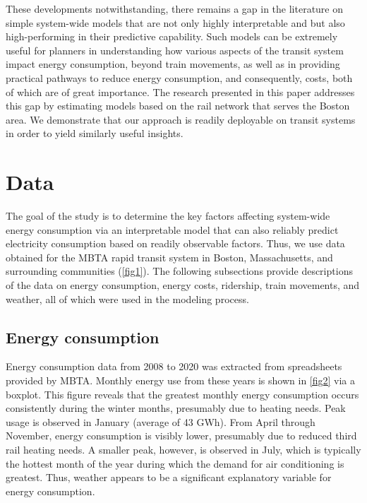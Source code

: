 \documentclass[times]{TRR}
\begin{document}
These developments notwithstanding, there remains a gap in the literature on simple system-wide models that are not only highly interpretable and but also high-performing in their predictive capability. Such models can be extremely useful for planners in understanding how various aspects of the transit system impact energy consumption, beyond train movements, as well as in providing practical pathways to reduce energy consumption, and consequently, costs, both of which are of great importance. The research presented in this paper addresses this gap by estimating models based on the rail network that serves the Boston area. We demonstrate that our approach is readily deployable on transit systems in order to yield similarly useful insights.


\section{Data}
 The goal of the study is to determine the key factors affecting system-wide energy consumption via an interpretable model that can also reliably predict electricity consumption based on readily observable factors. Thus, we use data obtained for the MBTA rapid transit system in Boston, Massachusetts, and surrounding communities (\autoref{fig1}).  The following subsections provide descriptions of the data on energy consumption, energy costs, ridership, train movements, and weather, all of which were used in the modeling process.

\subsection{Energy consumption}
Energy consumption data from 2008 to 2020 was extracted from spreadsheets provided by MBTA.  Monthly energy use from these years is shown in \autoref{fig2} via a boxplot. This figure reveals that the greatest monthly energy consumption occurs consistently during the winter months, presumably due to heating needs. Peak usage is observed in January (average of 43 GWh). From April through November, energy consumption is visibly lower, presumably due to reduced third rail heating needs. A smaller peak, however, is observed in July, which is typically the hottest month of the year during which the demand for air conditioning is greatest. Thus, weather appears to be a significant explanatory variable for energy consumption.
\end{document}
